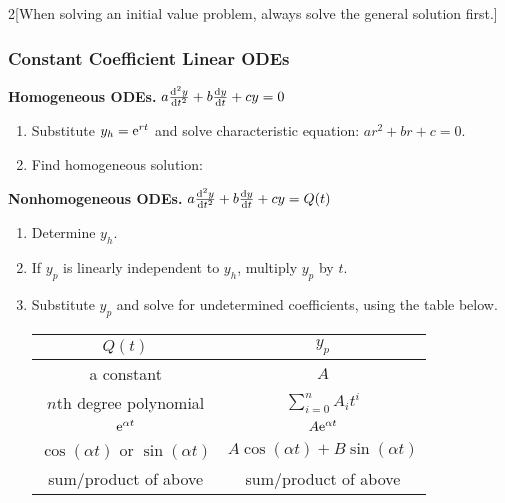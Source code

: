 \documentclass{article}
\begin{document}
\begin{multicols}{2}[When solving an initial value problem, always solve the general solution first.]
    \subsubsection*{Constant Coefficient Linear ODEs}
    \noindent \textbf{Homogeneous ODEs.} $a \dv[2]{y}{t} + b \dv{y}{t} + c y = 0$
    \begin{enumerate}[itemsep=1pt, parsep=1pt]
        \item Substitute $y_h = \mathrm{e}^{rt}$ and solve characteristic equation: $ar^2 + br + c = 0$.
        \item Find homogeneous solution:
    \end{enumerate} 
    \noindent \textbf{Nonhomogeneous ODEs.} $a \dv[2]{y}{t} + b \dv{y}{t} + c y = Q(t)$
    \begin{enumerate}[itemsep=1pt, parsep=1pt]
        \item Determine $y_h$.
        \item If $y_p$ is linearly independent to $y_h$, multiply $y_p$ by $t$.
        \item Substitute $y_p$ and solve for undetermined coefficients, using the table below.
        \begin{table}[H]
            \centering
            \begin{tabular}{c | c}
                \toprule
                $Q(t)$ & $y_p$ \\
                \midrule
                a constant & $A$ \\ 
                $n$th degree polynomial & $\sum_{i = 0}^n A_i t^i$ \\ 
                $\mathrm{e}^{\alpha t}$ & $A\mathrm{e}^{\alpha t}$ \\ 
                $\cos{\left( \alpha t \right)}$ or $\sin{\left( \alpha t \right)}$ & $A\cos{\left( \alpha t \right)} + B\sin{\left( \alpha t \right)}$ \\ 
                sum/product of above & sum/product of above \\ 
                \bottomrule
            \end{tabular}
            \vspace{1ex}


\end{table}
\end{enumerate}
\end{multicols}
\end{document}
